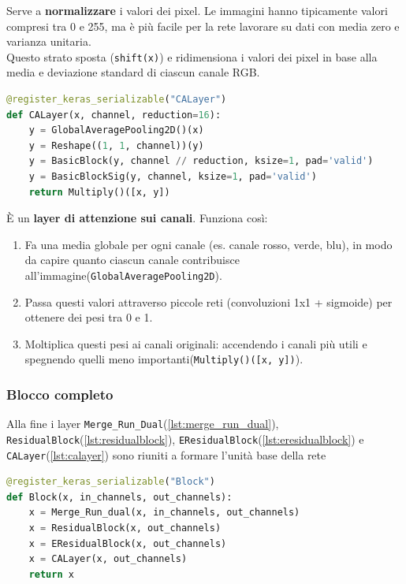 \documentclass[12pt,a4paper,openright,twoside]{book}
\begin{document}
Serve a \textbf{normalizzare} i valori dei pixel. Le immagini hanno tipicamente valori compresi tra 0 e 255, ma è più facile per la rete lavorare su dati con media zero e varianza unitaria.\\ 
Questo strato sposta (\texttt{shift(x)}) e ridimensiona i valori dei pixel in base alla media e deviazione standard di ciascun canale RGB.
\newpage
\begin{lstlisting}[language=Python, caption={Layer di attenzione sui canali (CALayer)}, label={lst:calayer}]
@register_keras_serializable("CALayer")
def CALayer(x, channel, reduction=16):
    y = GlobalAveragePooling2D()(x)
    y = Reshape((1, 1, channel))(y)
    y = BasicBlock(y, channel // reduction, ksize=1, pad='valid')
    y = BasicBlockSig(y, channel, ksize=1, pad='valid')
    return Multiply()([x, y])
\end{lstlisting}
È un \textbf{layer di attenzione sui canali}.  
Funziona così:  
\begin{enumerate}
    \item Fa una media globale per ogni canale (es. canale rosso, verde, blu), in modo da capire quanto ciascun canale contribuisce all'immagine(\texttt{GlobalAveragePooling2D}).
    \item Passa questi valori attraverso piccole reti (convoluzioni 1x1 + sigmoide) per ottenere dei pesi tra 0 e 1.
    \item Moltiplica questi pesi ai canali originali: accendendo i canali più utili e spegnendo quelli meno importanti(\texttt{Multiply()([x, y])}).
\end{enumerate}
\subsubsection*{Blocco completo}
Alla fine i layer \texttt{Merge\_Run\_Dual}(\ref{lst:merge_run_dual}), \texttt{ResidualBlock}(\ref{lst:residualblock}), \texttt{EResidualBlock}(\ref{lst:eresidualblock}) e \texttt{CALayer}(\ref{lst:calayer}) sono riuniti a formare l'unità base della rete

\begin{lstlisting}[language=Python, caption={Blocco completo che unisce moduli multiscala, residui e attenzione}, label={lst:block}]
@register_keras_serializable("Block")
def Block(x, in_channels, out_channels):
    x = Merge_Run_dual(x, in_channels, out_channels)
    x = ResidualBlock(x, out_channels)
    x = EResidualBlock(x, out_channels)
    x = CALayer(x, out_channels)
    return x
\end{lstlisting}
\end{document}
